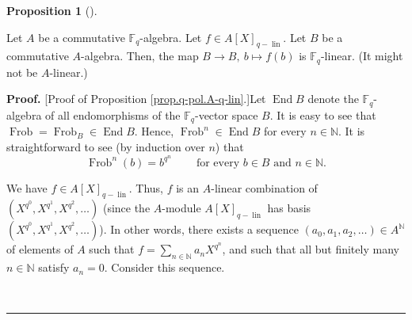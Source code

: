 \documentclass[numbers=enddot,12pt,final,onecolumn,notitlepage]{scrartcl}%
\theoremstyle{definition}
\newtheorem{prop}[theo]{Proposition}
\newenvironment{proposition}[1][]
{\begin{prop}[#1]\begin{leftbar}}
{\end{leftbar}\end{prop}}
\newenvironment{proof}[1][Proof]{\noindent\textbf{#1.} }{\ \rule{0.5em}{0.5em}}
\let\sumnonlimits\sum
\renewcommand{\sum}{\sumnonlimits\limits}
\begin{document}
\begin{proposition}
\label{prop.q-pol.A-q-lin}Let $A$ be a commutative $\mathbb{F}_{q}$-algebra.
Let $f\in A\left[  X\right]  _{q-\operatorname*{lin}}$. Let $B$ be a
commutative $A$-algebra. Then, the map $B\rightarrow B,\ b\mapsto f\left(
b\right)  $ is $\mathbb{F}_{q}$-linear. (It might not be $A$-linear.)
\end{proposition}

\begin{proof}
[Proof of Proposition \ref{prop.q-pol.A-q-lin}.]Let $\operatorname*{End}B$
denote the $\mathbb{F}_{q}$-algebra of all endomorphisms of the $\mathbb{F}%
_{q}$-vector space $B$. It is easy to see that $\operatorname*{Frob}%
=\operatorname*{Frob}\nolimits_{B}\in\operatorname*{End}B$. Hence,
$\operatorname*{Frob}\nolimits^{n}\in\operatorname*{End}B$ for every
$n\in\mathbb{N}$. It is straightforward to see (by induction over $n$) that%
\begin{equation}
\operatorname*{Frob}\nolimits^{n}\left(  b\right)  =b^{q^{n}}%
\ \ \ \ \ \ \ \ \ \ \text{for every }b\in B\text{ and }n\in\mathbb{N}.
\label{pf.prop.q-pol.A-q-lin.Frobn}%
\end{equation}


We have $f\in A\left[  X\right]  _{q-\operatorname*{lin}}$. Thus, $f$ is an
$A$-linear combination of $\left(  X^{q^{0}},X^{q^{1}},X^{q^{2}}%
,\ldots\right)  $ (since the $A$-module $A\left[  X\right]
_{q-\operatorname*{lin}}$ has basis $\left(  X^{q^{0}},X^{q^{1}},X^{q^{2}%
},\ldots\right)  $). In other words, there exists a sequence $\left(
a_{0},a_{1},a_{2},\ldots\right)  \in A^{\mathbb{N}}$ of elements of $A$ such
that $f=\sum_{n\in\mathbb{N}}a_{n}X^{q^{n}}$, and such that all but finitely
many $n\in\mathbb{N}$ satisfy $a_{n}=0$. Consider this sequence.


\end{proof}
\end{document}
